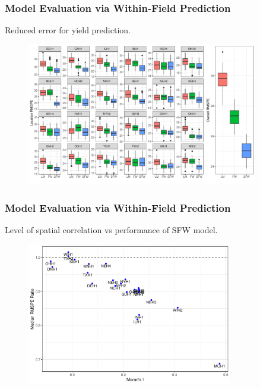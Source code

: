 \documentclass{beamer}
\begin{document}
\begin{frame}
	\frametitle{Model Evaluation via Within-Field Prediction}
	Reduced error for yield prediction.
	\begin{figure}[H]
		\centering
		\includegraphics[width = 0.9\textwidth]{com_pred3.pdf}
	\end{figure}
\end{frame}



\begin{frame}
	\frametitle{Model Evaluation via Within-Field Prediction}
Level of spatial correlation vs performance of SFW model.

	\begin{figure}[H]
		\centering
		\includegraphics[width = 0.8\textwidth]{morans_i.pdf}
	\end{figure}
\end{frame}
\end{document}
